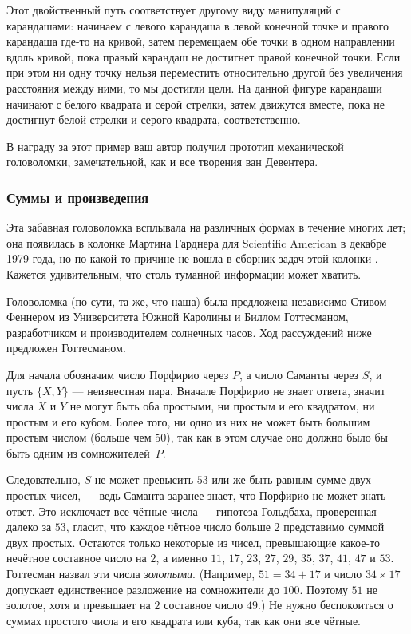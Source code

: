 Этот двойственный путь соответствует другому виду манипуляций с карандашами:
начинаем с левого карандаша в левой конечной точке и правого карандаша где-то на кривой,
затем перемещаем обе точки в одном направлении вдоль кривой, пока правый карандаш не достигнет правой конечной точки.
Если при этом ни одну точку нельзя переместить относительно другой без увеличения расстояния между ними, то мы достигли цели.
На данной фигуре карандаши начинают с белого квадрата и серой стрелки, затем движутся вместе, пока не достигнут белой стрелки и серого квадрата, соответственно.

\medskip

В награду за этот пример ваш автор получил прототип механической головоломки, замечательной, как и все творения ван Девентера.

\subsubsection*{Суммы и произведения}

Эта забавная головоломка всплывала на различных формах в течение многих лет; она появилась в колонке Мартина Гарднера для Scientific American в декабре 1979 года, но по какой-то причине не вошла в сборник задач этой колонки \cite{29}.
Кажется удивительным, что столь туманной информации может хватить.

Головоломка (по сути, та же, что наша) была предложена независимо Стивом Феннером из Университета Южной Каролины и Биллом Готтесманом, разработчиком и производителем солнечных часов.
Ход рассуждений ниже предложен Готтесманом.

Для начала обозначим число Порфирио через $P$, а число Саманты через $S$, и пусть $\{X, Y\}$ --- неизвестная пара.
Вначале Порфирио не знает ответа, значит числа $X$ и $Y$ не могут быть оба простыми,
ни простым и его квадратом,
ни простым и его кубом.
Более того, ни одно из них не может быть большим простым числом (больше чем $50$), так как в этом случае оно должно было бы быть одним из сомножителей~$P$.

Следовательно, $S$ не может превысить $53$ или же быть равным сумме двух простых чисел, --- ведь Саманта заранее знает, что Порфирио не может знать ответ.
Это исключает все чётные числа --- гипотеза Гольдбаха, проверенная далеко за $53$, гласит, что каждое чётное число больше $2$ представимо суммой двух простых.
Остаются только некоторые из чисел, превышающие какое-то нечётное составное число на $2$, а именно $11$, $17$, $23$, $27$, $29$, $35$, $37$, $41$, $47$ и $53$.
Готтесман назвал эти числа \emph{золотыми}.
(Например, $51=34+17$ и число $34\times 17$ допускает единственное разложение на сомножители до $100$. Поэтому $51$ не золотое, хотя и превышает на $2$ составное число $49$.)
Не нужно беспокоиться о суммах простого числа и его квадрата или куба, так как они все чётные.

